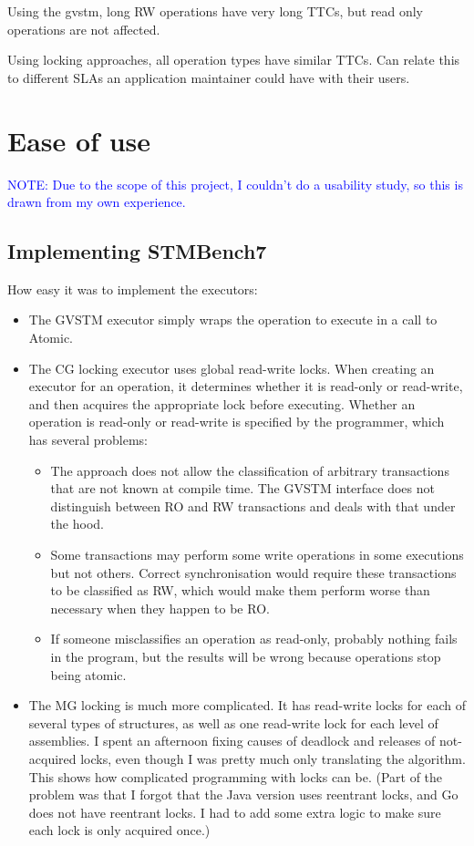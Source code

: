 \documentclass[12pt,a4paper,oneside,openright]{report}
\newcommand{\note}[1]{\textcolor{blue}{NOTE: #1}}
\begin{document}
Using the gvstm, long RW operations have very long TTCs, but read only
operations are not affected.

Using locking approaches, all operation types have similar TTCs. Can
relate this to different SLAs an application maintainer could have
with their users.

\section{Ease of use}
\label{sec:eval:ease-use}

\note{Due to the scope of this project, I couldn't do a usability
  study, so this is drawn from my own experience.}

\subsection{Implementing STMBench7}
\label{sec:eval:impl-stmb}

How easy it was to implement the executors:

\begin{itemize}
\item The GVSTM executor simply wraps the operation to execute in a
  call to Atomic.
\item The CG locking executor uses global read-write locks. When
  creating an executor for an operation, it determines whether it is
  read-only or read-write, and then acquires the appropriate lock
  before executing. Whether an operation is read-only or read-write is
  specified by the programmer, which has several problems:
  \begin{itemize}
  \item The approach does not allow the classification of arbitrary
    transactions that are not known at compile time. The GVSTM
    interface does not distinguish between RO and RW transactions and
    deals with that under the hood.
  \item Some transactions may perform some write operations in some
    executions but not others. Correct synchronisation would require
    these transactions to be classified as RW, which would make them
    perform worse than necessary when they happen to be RO.
  \item If someone misclassifies an operation as read-only, probably
    nothing fails in the program, but the results will be wrong
    because operations stop being atomic.
  \end{itemize}

\item The MG locking is much more complicated. It has read-write locks
  for each of several types of structures, as well as one read-write
  lock for each level of assemblies. I spent an afternoon fixing
  causes of deadlock and releases of not-acquired locks, even though I
  was pretty much only translating the algorithm. This shows how
  complicated programming with locks can be. (Part of the problem was
  that I forgot that the Java version uses reentrant locks, and Go
  does not have reentrant locks. I had to add some extra logic to make
  sure each lock is only acquired once.)
\end{itemize}
\end{document}
